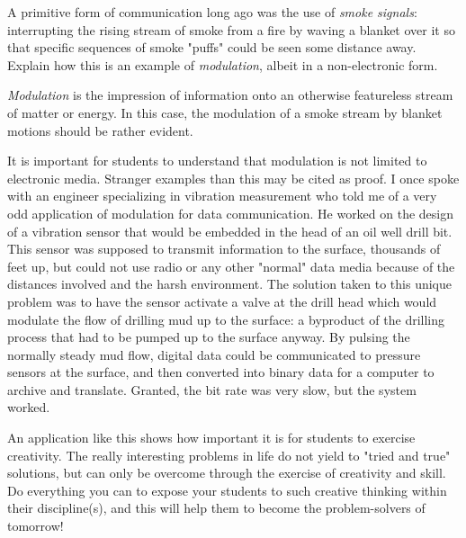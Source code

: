 

A primitive form of communication long ago was the use of {\it smoke signals}: interrupting the rising stream of smoke from a fire by waving a blanket over it so that specific sequences of smoke "puffs" could be seen some distance away.  Explain how this is an example of {\it modulation}, albeit in a non-electronic form.







{\it Modulation} is the impression of information onto an otherwise featureless stream of matter or energy.  In this case, the modulation of a smoke stream by blanket motions should be rather evident.







It is important for students to understand that modulation is not limited to electronic media.  Stranger examples than this may be cited as proof.  I once spoke with an engineer specializing in vibration measurement who told me of a very odd application of modulation for data communication.  He worked on the design of a vibration sensor that would be embedded in the head of an oil well drill bit.  This sensor was supposed to transmit information to the surface, thousands of feet up, but could not use radio or any other "normal" data media because of the distances involved and the harsh environment.  The solution taken to this unique problem was to have the sensor activate a valve at the drill head which would modulate the flow of drilling mud up to the surface: a byproduct of the drilling process that had to be pumped up to the surface anyway.  By pulsing the normally steady mud flow, digital data could be communicated to pressure sensors at the surface, and then converted into binary data for a computer to archive and translate.  Granted, the bit rate was very slow, but the system worked.

An application like this shows how important it is for students to exercise creativity.  The really interesting problems in life do not yield to "tried and true" solutions, but can only be overcome through the exercise of creativity and skill.  Do everything you can to expose your students to such creative thinking within their discipline(s), and this will help them to become the problem-solvers of tomorrow!




